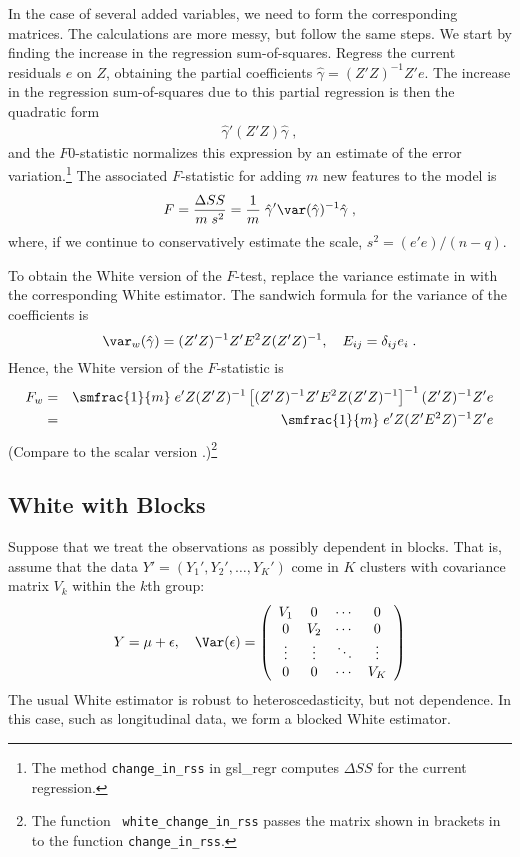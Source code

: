 \documentclass[12pt]{article}
\begin{document}
 In the case of several added variables, we need to form the corresponding
 matrices.  The calculations are more messy, but follow the same steps.  We
 start by finding the increase in the regression sum-of-squares.  Regress the
 current residuals $e$ on $Z$, obtaining the partial coefficients $\hat\gamma =
 (Z'Z)^{-1}Z'e$.  The increase in the regression sum-of-squares due to this
 partial regression is then the quadratic form
\begin{eqnarray}
   \hat\gamma'(Z'Z)\hat\gamma \;,
\label{eq:dss}
\end{eqnarray}
 and the $F$0-statistic normalizes this expression by an estimate of the error
 variation.\footnote{The method {\tt change\_in\_rss} in gsl\_regr computes
 $\Delta SS$ for the current regression.}  The associated $F$-statistic for
 adding $m$ new features to the model is
\begin{equation}
  F = \frac{\Delta SS}{m \; s^2} 
    = \frac{1}{m} \; \hat\gamma' \var(\hat\gamma)^{-1} \hat\gamma \;,
\label{eq:F}
\end{equation}
where, if we continue to conservatively estimate the scale, $s^2 = (e'e)/(n-q)$.


 To obtain the White version of the $F$-test, replace the variance estimate in
  with the corresponding White estimator.  The sandwich formula for
 the variance of the coefficients is
\begin{displaymath}
  \var_w(\hat\gamma) = (Z'Z)^{-1} Z'E^2Z (Z'Z)^{-1}, 
  \quad E_{ij} = \delta_{ij} e_i\;.
\end{displaymath}
 Hence, the White version of the $F$-statistic  is
\begin{eqnarray}
  F_w
 &=& \smfrac{1}{m} \;
     e'Z(Z'Z)^{-1}\left[(Z'Z)^{-1}Z'E^2Z(Z'Z)^{-1}\right]^{-1}(Z'Z)^{-1}Z'e \cr
 &=& \smfrac{1}{m} \; e'Z (Z'E^2Z)^{-1} Z'e 
\label{eq:Fw}
\end{eqnarray}
 (Compare to the scalar version .)\footnote{The function {\tt
 white\_change\_in\_rss} passes the matrix shown in brackets in  to
 the function {\tt change\_in\_rss}.}

\subsection{White with Blocks}

 Suppose that we treat the observations as possibly dependent in blocks.  That
 is, assume that the data $Y' = (Y_1', Y_2', \ldots, Y_K')$ come in $K$ clusters
 with covariance matrix $V_k$ within the $k$th group:
\begin{displaymath}
  Y = \mu + \epsilon, \quad \Var(\epsilon) = 
     \left(
     \begin{array}{ccccc}
       V_1     & 0      & \cdots & 0      \cr
        0      & V_2    & \cdots & 0      \cr
       \vdots  & \vdots & \ddots & \vdots \cr
        0      & 0      & \cdots & V_K   
     \end{array}  
     \right)
\end{displaymath}
 The usual White estimator is robust to heteroscedasticity, but not
 dependence. In this case, such as longitudinal data, we form a blocked White
 estimator. 
\end{document}
